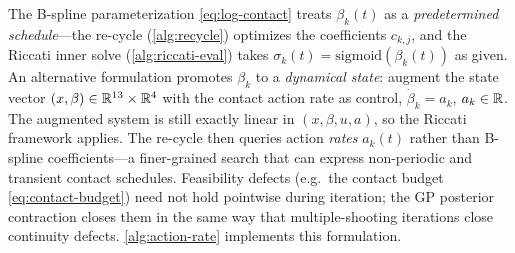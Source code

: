 \begin{remark}
\label{rem:action-driven}
The B-spline parameterization \eqref{eq:log-contact} treats
$\beta_k(t)$ as a \emph{predetermined schedule}---the re-cycle
(\cref{alg:recycle}) optimizes the coefficients $c_{k,j}$, and the
Riccati inner solve (\cref{alg:riccati-eval})
takes $\sigma_k(t) = \mathrm{sigmoid}(\beta_k(t))$ as given.
An alternative formulation promotes $\beta_k$ to a
\emph{dynamical state}: augment the state vector
$(x, \beta) \in \mathbb{R}^{13} \times \mathbb{R}^4$ with the contact action
rate as control, $\dot{\beta}_k = a_k$, $a_k \in \mathbb{R}$.
The augmented system is still exactly linear in $(x, \beta, u, a)$,
so the Riccati framework applies.
The re-cycle then queries action \emph{rates} $a_k(t)$
rather than B-spline coefficients---a finer-grained search that
can express non-periodic and transient contact schedules.
Feasibility defects (e.g.\ the contact budget
\eqref{eq:contact-budget}) need not hold pointwise during
iteration; the GP posterior contraction closes them in the same
way that
multiple-shooting iterations close continuity defects.
\cref{alg:action-rate} implements this formulation.
\end{remark}

